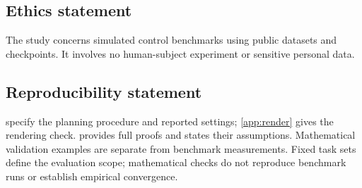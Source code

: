 \documentclass{article}
\theoremstyle{definition}
\theoremstyle{remark}
\begin{document}
\subsection*{Ethics statement}
The study concerns simulated control benchmarks using public datasets and checkpoints.
It involves no human-subject experiment or sensitive personal data.

\subsection*{Reproducibility statement}
 specify the planning procedure and reported settings;
\cref{app:render} gives the rendering check.  provides full proofs and
states their assumptions. Mathematical validation examples are separate from benchmark
measurements. Fixed task sets define the evaluation scope; mathematical checks do not
reproduce benchmark runs or establish empirical convergence.
\end{document}
